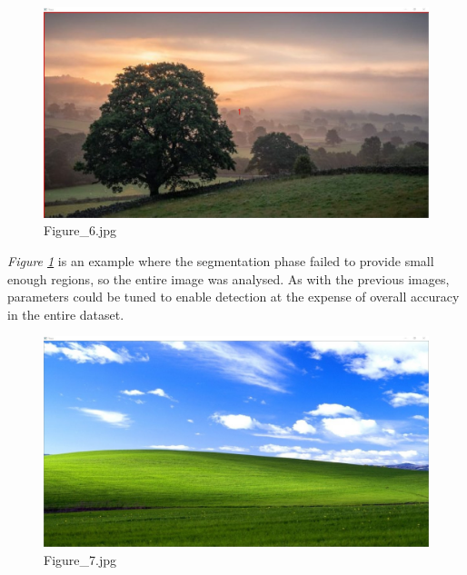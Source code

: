 \documentclass{article}
\begin{document}
\begin{figure}[h]
\begin{center}
\includegraphics[width=1\textwidth]{images/b6}
\caption{\footnotesize{Figure\_6.jpg}}
\label{img:benchmark6}
\end{center}
\end{figure}

\textit{Figure \ref{img:benchmark6}} is an example where the segmentation phase failed to provide small enough regions, so the entire image was analysed. As with the previous images, parameters could be tuned to enable detection at the expense of overall accuracy in the entire dataset.

\begin{figure}[h]
\begin{center}
\includegraphics[width=1\textwidth]{images/b7}
\caption{\footnotesize{Figure\_7.jpg}}
\label{img:benchmark7}
\end{center}
\end{figure}
\end{document}
